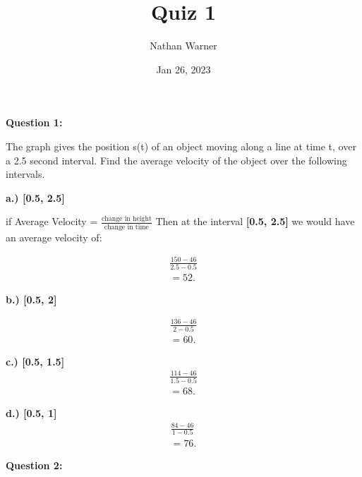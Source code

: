 \documentclass{report}
\title{\Huge{Quiz 1 }}
\author{\huge{Nathan Warner}}
\date{\huge{Jan 26, 2023}}
\begin{document}
    \maketitle

    \bigbreak \noindent \bigbreak \noindent 
   
    \bigbreak \noindent 
    \begin{Large}
       \textbf{Question 1:} 
    \end{Large}
    
    \bigbreak \noindent 
        The graph gives the position s(t) of an object moving along a line at time t, over a 2.5
        second interval. Find the average velocity of the object over the following intervals.

    \bigbreak \noindent 
    \textbf{a.) [0.5, 2.5]}

    \bigbreak \noindent 
    \noindent if Average Velocity = $ \frac{\text{change in height}}{\text{change in time}}$ 
    \bigbreak \noindent 
    Then at the interval \textbf{[0.5, 2.5]} we would have an average velocity of:

    \begin{align*}
        \frac{150-46}{2.5-0.5} \\
        =52
    .\end{align*}

    \bigbreak \noindent 
    \textbf{b.) [0.5, 2]}
   
    \bigbreak \noindent 
    \begin{align*}
        \frac{136-46}{2-0.5} \\
        =60
    .\end{align*}

    \bigbreak \noindent 
    \textbf{c.) [0.5, 1.5]} 
    \bigbreak \noindent 
    \begin{align*}
        \frac{114-46}{1.5-0.5} \\
        = 68
    .\end{align*}

    \bigbreak \noindent 
    \textbf{d.) [0.5, 1]}
    \bigbreak \noindent 
    \begin{align*}
        \frac{84-46}{1-0.5} \\ 
        = 76
    .\end{align*}

    \pagebreak
    \begin{Large}
       \noindent \textbf{Question 2:} 
    \end{Large}
\end{document}
